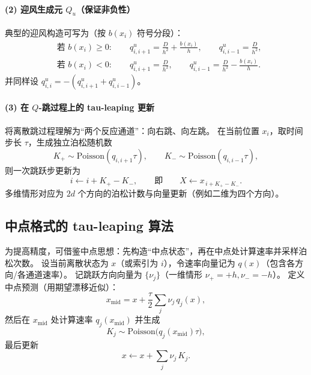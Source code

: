 	\paragraph{(2) 迎风生成元 $Q_u$（保证非负性）}
	典型的迎风构造可写为（按 $b(x_i)$ 符号分段）：
	\begin{equation}\label{eq:Qu_rates}
		\begin{aligned}
			&\text{若 } b(x_i)\ge 0:\qquad
			q^{u}_{i,i+1}=\frac{D}{h^2}+\frac{b(x_i)}{h},\qquad
			q^{u}_{i,i-1}=\frac{D}{h^2},\\
			&\text{若 } b(x_i)<0:\qquad
			q^{u}_{i,i+1}=\frac{D}{h^2},\qquad
			q^{u}_{i,i-1}=\frac{D}{h^2}-\frac{b(x_i)}{h}.
		\end{aligned}
	\end{equation}
	并同样设 $q^{u}_{i,i}=-(q^{u}_{i,i+1}+q^{u}_{i,i-1})$。
	
	\paragraph{(3) 在 $Q$-跳过程上的 tau-leaping 更新}
	将离散跳过程理解为“两个反应通道”：向右跳、向左跳。
	在当前位置 $x_i$，取时间步长 $\tau$，生成独立泊松随机数
	\[
	K_+ \sim \mathrm{Poisson}(q_{i,i+1}\tau),\qquad
	K_- \sim \mathrm{Poisson}(q_{i,i-1}\tau),
	\]
	则一次跳跃步更新为
	\begin{equation}\tag{3.2}\label{eq:Q_tau_update}
		i \leftarrow i + K_+ - K_-,
		\qquad\text{即}\qquad
		X \leftarrow x_{\,i+K_+-K_-}.
	\end{equation}
	多维情形对应为 $2d$ 个方向的泊松计数与向量更新（例如二维为四个方向）。
	
	\subsection{中点格式的 tau-leaping 算法}
	
	为提高精度，可借鉴中点思想：先构造“中点状态”，再在中点处计算速率并采样泊松次数。
	设当前离散状态为 $x$（或索引为 $i$），令速率向量记为 $q(x)$（包含各方向/各通道速率）。
	记跳跃方向向量为 $\{\nu_j\}$（一维情形 $\nu_+=+h,\nu_-=-h$）。
	定义中点预测（用期望漂移近似）：
	\begin{equation}\label{eq:midpoint_predict}
		x_{\mathrm{mid}}
		=
		x+\frac{\tau}{2}\sum_j \nu_j\,q_j(x),
	\end{equation}
	然后在 $x_{\mathrm{mid}}$ 处计算速率 $q_j(x_{\mathrm{mid}})$ 并生成
	\[
	K_j \sim \mathrm{Poisson}\bigl(q_j(x_{\mathrm{mid}})\tau\bigr),
	\]
	最后更新
	\begin{equation}\label{eq:midpoint_update}
		x \leftarrow x+\sum_j \nu_j\,K_j.
	\end{equation}
	
